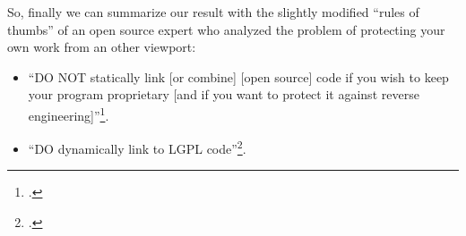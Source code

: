 %
%
%
%
%

So, finally we can summarize our result with the slightly modified
\enquote{rules of thumbs} of an open source expert who analyzed the problem of
protecting your own work from an other viewport:

\begin{itemize}
  \item \enquote{DO NOT statically link [or combine] [open source] code if you
  wish to keep your program proprietary [and if you want to protect it against reverse
  engineering]}\footcite[cf.][6]{Ilardi2010a}.
  \item \enquote{DO dynamically link to LGPL
  code}\footcite[cf.][6]{Ilardi2010a}.
\end{itemize}


